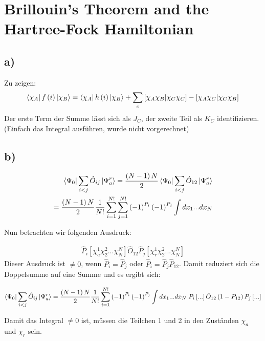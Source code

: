 \section{Brillouin’s Theorem and the Hartree-Fock Hamiltonian}

\subsection{a)}
Zu zeigen:
\begin{equation}
\Bra{\chi_A} f\left( i \right) \Ket{\chi_B} = \Bra{\chi_A} h \left( i \right) \Ket{\chi_B} + \sum_c \left[\chi_A \chi_B |\chi_C \chi_C \right] - \left[ \chi_A\chi_C | \chi_C\chi_B \right]
\end{equation}
Der erste Term der Summe l\"asst sich als $J_C$, der zweite Teil als $K_C$ identifizieren.\\
(Einfach das Integral ausf\"uhren, wurde nicht vorgerechnet)

\subsection{b)}
 \begin{align}
 \Bra{\Psi_0} \sum_{i<j} \hat{O}_{ij} \Ket{\Psi_a^r} = \frac{\left(N-1\right)N}{2} \Bra{\Psi_0} \sum_{i<j} \hat{O}_{12} \Ket{\Psi_a^r} \\
 = \frac{\left(N-1\right)N}{2} \frac{1}{N!} \sum_{i=1}^{N!} \sum_{j=1}^{N!} \left(-1\right)^{P_i} \left(-1\right)^{P_j} \int dx_1 ... dx_N
 \end{align}
 
 Nun betrachten wir folgenden Ausdruck:
 
 \begin{align}
 \hat{P}_i \left[ \chi_a^1 \chi_2^2 ... \chi_N^N \right] \hat{O}_{12} \hat{P}_j \left[ \chi_r^1 \chi_2^2 ... \chi_N^N \right]
 \end{align}
 Dieser Ausdruck ist $\neq 0$, wenn $\hat{P}_i = \hat{P}_j$ oder $\hat{P}_i = \hat{P}_j \hat{P}_{12}$. Damit reduziert sich die Doppelsumme auf eine Summe und es ergibt sich:
 
\begin{align}
\Bra{\Psi_0} \sum_{i<j} \hat{O}_{ij} \Ket{\Psi_a^r} = \frac{\left(N-1\right)N}{2} \frac{1}{N!} \sum_{i=1}^{N!} \left(-1\right)^{P_i} \left(-1\right)^{P_j} \int dx_1 ... dx_N \; P_i \left[...\right] \hat{O}_{12} \left( 1 - P_{12} \right) P_j \left[...\right]
\end{align}

Damit das Integral $\neq 0$ ist, m\"ussen die Teilchen 1 und 2 in den Zust\"anden $\chi_a$ und $\chi_r$ sein.

